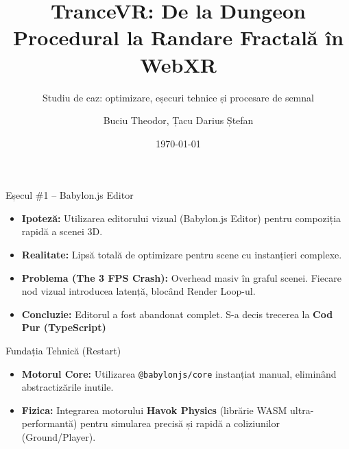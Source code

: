 \documentclass[11pt, aspectratio=169]{beamer}
\title[TranceVR]{TranceVR: De la Dungeon Procedural la Randare Fractală în WebXR}
\subtitle{Studiu de caz: optimizare, eșecuri tehnice și procesare de semnal}
\author{Buciu Theodor, Țacu Darius Ștefan}
\date{\today}
\begin{document}
\begin{frame}
    \titlepage
\end{frame}

\begin{frame}{Eșecul \#1 – Babylon.js Editor}
    \begin{itemize}
        \item \textbf{Ipoteză:} Utilizarea editorului vizual (Babylon.js Editor) pentru compoziția rapidă a scenei 3D.
        \item \textbf{Realitate:} Lipsă totală de optimizare pentru scene cu instanțieri complexe.
        \item \textbf{Problema (The 3 FPS Crash):} Overhead masiv în graful scenei. Fiecare nod vizual introducea latență, blocând Render Loop-ul.
        \item \textbf{Concluzie:} Editorul a fost abandonat complet. S-a decis trecerea la \textbf{Cod Pur (TypeScript)}
    \end{itemize}
\end{frame}

\begin{frame}{Fundația Tehnică (Restart)}
    \begin{itemize}
        \item \textbf{Motorul Core:} Utilizarea \texttt{@babylonjs/core} instanțiat manual, eliminând abstractizările inutile.
        \item \textbf{Fizica:} Integrarea motorului \textbf{Havok Physics} (librărie WASM ultra-performantă) pentru simularea precisă și rapidă a coliziunilor (Ground/Player).
    \end{itemize}
\end{frame}
\end{document}
